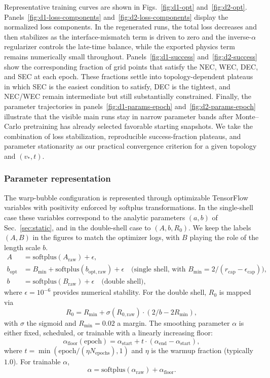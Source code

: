 \documentclass[11pt]{article}
\begin{document}
Representative training curves are shown in Figs.~\ref{fig:d1-opt} and~\ref{fig:d2-opt}. Panels~\ref{fig:d1-loss-components} and~\ref{fig:d2-loss-components} display the normalized loss components. In the regenerated runs, the total loss decreases and then stabilizes as the interface-mismatch term is driven to zero and the inverse-$\alpha$ regularizer controls the late-time balance, while the exported physics term remains numerically small throughout. Panels~\ref{fig:d1-success} and~\ref{fig:d2-success} show the corresponding fraction of grid points that satisfy the NEC, WEC, DEC, and SEC at each epoch. These fractions settle into topology-dependent plateaus in which SEC is the easiest condition to satisfy, DEC is the tightest, and NEC/WEC remain intermediate but still substantially constrained. Finally, the parameter trajectories in panels~\ref{fig:d1-params-epoch} and~\ref{fig:d2-params-epoch} illustrate that the visible main runs stay in narrow parameter bands after Monte--Carlo pretraining has already selected favorable starting snapshots. We take the combination of loss stabilization, reproducible success-fraction plateaus, and parameter stationarity as our practical convergence criterion for a given topology and $(v_*,t)$.

\subsubsection{Parameter representation}
The warp-bubble configuration is represented through optimizable TensorFlow variables with positivity enforced by softplus transformations. In the single-shell case these variables correspond to the analytic parameters $(a,b)$ of Sec.~\ref{sec:static}, and in the double-shell case to $(A,b,R_0)$. We keep the labels $(A,B)$ in the figures to match the optimizer logs, with $B$ playing the role of the length scale $b$.
\begin{align}
A &= \mathrm{softplus}(A_{\text{raw}}) + \epsilon, \\
b_{\mathrm{opt}} &= B_{\min} + \mathrm{softplus}(b_{\mathrm{opt,raw}}) + \epsilon \quad \text{(single shell, with } B_{\min} = 2 / (r_{\text{cap}} - \epsilon_{\text{cap}})\text{)}, \\
b &= \mathrm{softplus}(B_{\text{raw}}) + \epsilon \quad \text{(double shell)},
\end{align}
where $\epsilon = 10^{-6}$ provides numerical stability. For the double shell, $R_0$ is mapped via
\[
R_0 = R_{\min} + \sigma(R_{0,\text{raw}}) \cdot (2/b - 2R_{\min}),
\]
with $\sigma$ the sigmoid and $R_{\min} = 0.02$ a margin. The smoothing parameter $\alpha$ is either fixed, scheduled, or trainable with a linearly increasing floor:
\[
\alpha_{\text{floor}}(\text{epoch}) = \alpha_{\text{start}} + t \cdot (\alpha_{\text{end}} - \alpha_{\text{start}}),
\]
where $t = \min(\text{epoch} / (\eta N_{\text{epochs}}), 1)$ and $\eta$ is the warmup fraction (typically $1.0$). For trainable $\alpha$,
\[
\alpha = \mathrm{softplus}(\alpha_{\text{raw}}) + \alpha_{\text{floor}}.
\]
\end{document}
